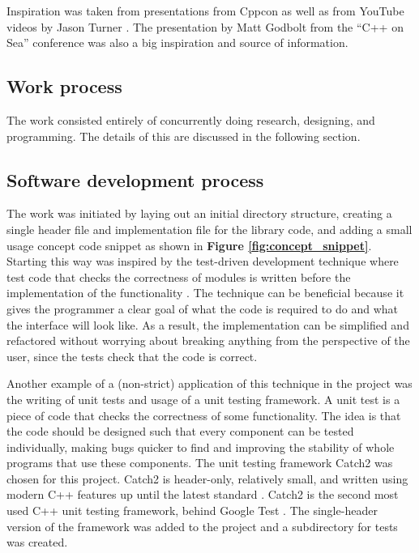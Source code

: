 \documentclass[12pt, a4paper]{article}
\begin{document}
Inspiration was taken from presentations from Cppcon \parencite{CppCon} as well as from YouTube videos by Jason Turner \parencite{JasonTurnerChannel}. The presentation  by Matt Godbolt \parencite{MattGodboltCorrectByConstruction} from the “C++ on Sea” conference was also a big inspiration and source of information.

\subsection{Work process}
The work consisted entirely of concurrently doing research, designing, and programming. The details of this are discussed in the following section.

\subsection{Software development process}
The work was initiated by laying out an initial directory structure, creating a single header file and implementation file for the library code, and adding a small usage concept code snippet as shown in \textbf{Figure \ref{fig:concept_snippet}}. Starting this way was inspired by the test-driven development technique where test code that checks the correctness of modules is written before the implementation of the functionality \parencite{TestDrivenDevelopment}. The technique can be beneficial because it gives the programmer a clear goal of what the code is required to do and what the interface will look like. As a result, the implementation can be simplified and refactored without worrying about breaking anything from the perspective of the user, since the tests check that the code is correct. 

Another example of a (non-strict) application of this technique in the project was the writing of unit tests and usage of a unit testing framework. A unit test is a piece of code that checks the correctness of some functionality. The idea is that the code should be designed such that every component can be tested individually, making bugs quicker to find and improving the stability of whole programs that use these components. The unit testing framework Catch2 was chosen for this project. Catch2 is header-only, relatively small, and written using modern C++ features up until the latest standard \parencite{Catch2}. Catch2 is the second most used C++ unit testing framework, behind Google Test \parencite{DeveloperStatistics}. The single-header version of the framework was added to the project and a subdirectory for tests was created. 
\end{document}

